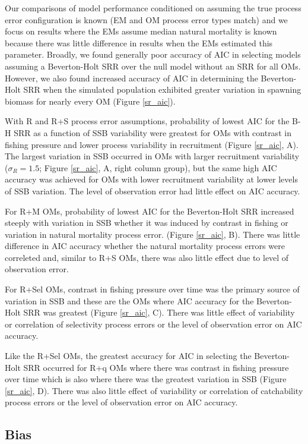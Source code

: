 \documentclass[
  12pt,
]{article}
\begin{document}
Our comparisons of model performance conditioned on assuming the true
process error configuration is known (EM and OM process error types
match) and we focus on results where the EMs assume median natural
mortality is known because there was little difference in results when
the EMs estimated this parameter. Broadly, we found generally poor
accuracy of AIC in selecting models assuming a Beverton-Holt SRR over
the null model without an SRR for all OMs. However, we also found
increased accuracy of AIC in determining the Beverton-Holt SRR when the
simulated population exhibited greater variation in spawning biomass for
nearly every OM (Figure \ref{sr_aic}).

With R and R+S process error assumptions, probability of lowest AIC for
the B-H SRR as a function of SSB variability were greatest for OMs with
contrast in fishing pressure and lower process variability in
recruitment (Figure \ref{sr_aic}, A). The largest variation in SSB
occurred in OMs with larger recruitment variability (\(\sigma_R = 1.5\);
Figure \ref{sr_aic}, A, right column group), but the same high AIC
accuracy was achieved for OMs with lower recruitment variability at
lower levels of SSB variation. The level of observation error had little
effect on AIC accuracy.

For R+M OMs, probability of lowest AIC for the Beverton-Holt SRR
increased steeply with variation in SSB whether it was induced by
contrast in fishing or variation in natural mortality process error.
(Figure \ref{sr_aic}, B). There was little difference in AIC accuracy
whether the natural mortality process errors were correleted and,
similar to R+S OMs, there was also little effect due to level of
observation error.

For R+Sel OMs, contrast in fishing pressure over time was the primary
source of variation in SSB and these are the OMs where AIC accuracy for
the Beverton-Holt SRR was greatest (Figure \ref{sr_aic}, C). There was
little effect of variability or correlation of selectivity process
errors or the level of observation error on AIC accuracy.

Like the R+Sel OMs, the greatest accuracy for AIC in selecting the
Beverton-Holt SRR occurred for R+q OMs where there was contrast in
fishing pressure over time which is also where there was the greatest
variation in SSB (Figure \ref{sr_aic}, D). There was also little effect
of variability or correlation of catchability process errors or the
level of observation error on AIC accuracy.

\subsection*{Bias}\label{bias-1}
\end{document}
